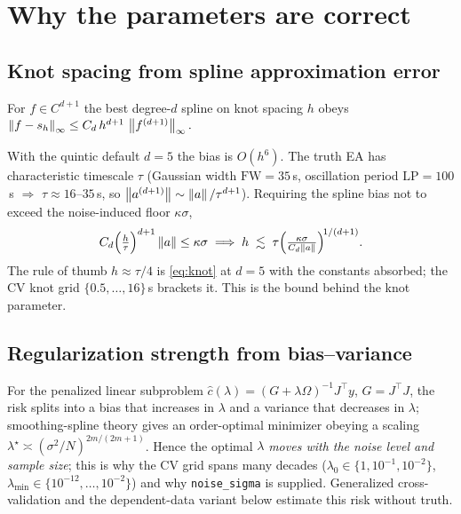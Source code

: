 \section{Why the parameters are correct}

\subsection{Knot spacing from spline approximation error}

\begin{theorem}
\label{thm:spline}
For $f\in C^{d+1}$ the best degree-$d$ spline on knot spacing $h$ obeys
$\left\lVert f-s_h\right\rVert_\infty \le C_d\,h^{d+1}\,\left\lVert f^{(d+1)}\right\rVert_\infty .$
\end{theorem}

With the quintic default $d=5$ the bias is $O(h^{6})$. The truth EA has
characteristic timescale $\tau$ (Gaussian width $\mathrm{FW}=35$\,s,
oscillation period $\mathrm{LP}=100$\,s $\Rightarrow$ $\tau\approx
16\text{--}35$\,s, so $\left\lVert a^{(d+1)}\right\rVert\sim\left\lVert a\right\rVert/\tau^{d+1}$). Requiring
the spline bias not to exceed the noise-induced floor $\kappa\sigma$,
\begin{equation}
C_d\Big(\tfrac{h}{\tau}\Big)^{d+1}\left\lVert a\right\rVert \le \kappa\sigma
\;\Longrightarrow\;
h \;\lesssim\; \tau\Big(\tfrac{\kappa\sigma}{C_d\left\lVert a\right\rVert}\Big)^{\!1/(d+1)} .
\label{eq:knot}
\end{equation}
The rule of thumb $h\approx\tau/4$ is \eqref{eq:knot} at $d=5$ with the
constants absorbed; the CV knot grid $\{0.5,\dots,16\}$\,s brackets it.
This is the bound behind the knot parameter.

\subsection{Regularization strength from bias--variance}

For the penalized linear subproblem
$\hat c(\lambda)=(G+\lambda\Omega)^{-1}J^{\!\top}\!y$, $G=J^{\!\top}\!J$,
the risk splits into a bias that increases in $\lambda$ and a variance that
decreases in $\lambda$; smoothing-spline theory
\cite{wahba1990,craven1979} gives an order-optimal minimizer obeying a
scaling $\lambda^\star \asymp (\sigma^{2}/N)^{2m/(2m+1)}$. Hence the
optimal $\lambda$ \emph{moves with the noise level and sample size}; this
is why the CV grid spans many decades
($\lambda_0\in\{1,10^{-1},10^{-2}\}$,
$\lambda_{\min}\in\{10^{-12},\dots,10^{-2}\}$) and why
\texttt{noise\_sigma} is supplied. Generalized cross-validation
\cite{golub1979} and the dependent-data variant below estimate this risk
without truth.

